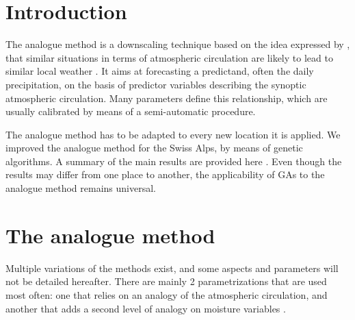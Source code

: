 \documentclass{ametsoc}
\begin{document}


\section{Introduction}
\label{section_intro}

The analogue method is a downscaling technique based on the idea expressed by \citet{Lorenz1969}, that similar situations in terms of atmospheric circulation are likely to lead to similar local weather \citep{Bontron2005}. It aims at forecasting a predictand, often the daily precipitation, on the basis of predictor variables describing the synoptic atmospheric circulation. Many parameters define this relationship, which are usually calibrated by means of a semi-automatic procedure.

The analogue method has to be adapted to every new location it is applied. We improved the analogue method for the Swiss Alps, by means of genetic algorithms. A summary of the main results are provided here \citep[see][for the details]{Horton2012a}. Even though the results may differ from one place to another, the applicability of GAs to the analogue method remains universal.



\section{The analogue method}
\label{section_analog_method}

Multiple variations of the methods exist, and some aspects and parameters will not be detailed hereafter. There are mainly 2 parametrizations that are used most often: one that relies on an analogy of the atmospheric circulation, and another that adds a second level of analogy on moisture variables \citep{Obled2002, Bontron2005, Marty2012}.
\end{document}
